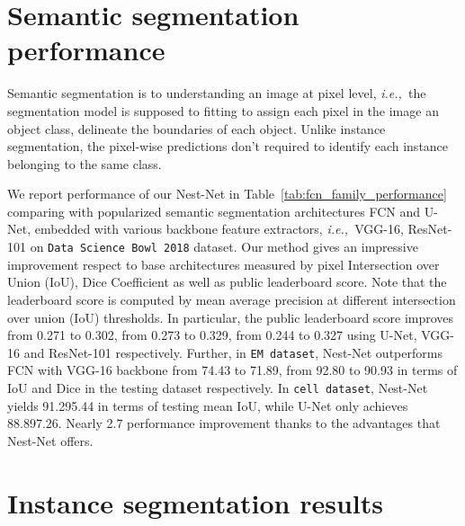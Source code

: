 \documentclass[runningheads]{llncs}
\newcommand{\ie}{\mbox{\emph{i.e.,\ }}}
\begin{document}
\section{Semantic segmentation performance}
\label{sec:semantic_results}

Semantic segmentation is to understanding an image at pixel level, \ie the segmentation model is supposed to fitting to assign each pixel in the image an object class, delineate the boundaries of each object. Unlike instance segmentation, the pixel-wise predictions don't required to identify each instance belonging to the same class.

We report performance of our Nest-Net in Table~\ref{tab:fcn_family_performance} comparing with popularized semantic segmentation architectures FCN and U-Net, embedded with various backbone feature extractors, \ie VGG-16, ResNet-101 on \texttt{Data Science Bowl 2018} dataset. Our method gives an impressive improvement respect to base architectures measured by pixel Intersection over Union (IoU), Dice Coefficient as well as public leaderboard score. Note that the leaderboard score is computed by mean average precision at different intersection over union (IoU) thresholds. In particular, the public leaderboard score improves from 0.271 to 0.302, from 0.273 to 0.329, from 0.244 to 0.327 using  U-Net, VGG-16 and ResNet-101 respectively. Further, in \texttt{EM dataset}, Nest-Net outperforms FCN with VGG-16 backbone from 74.43 to 71.89, from 92.80 to 90.93 in terms of IoU and Dice in the testing dataset respectively. In \texttt{cell dataset}, Nest-Net yields 91.295.44 in terms of testing mean IoU, while U-Net only achieves 88.897.26. Nearly 2.7 performance improvement thanks to the advantages that Nest-Net offers.

\section{Instance segmentation results}
\end{document}
